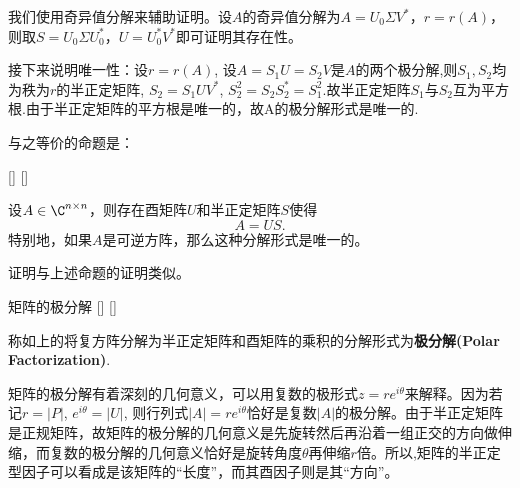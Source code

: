 \documentclass[UTF8]{ctexart}
\begin{document}
		\begin{prf}
			我们使用奇异值分解来辅助证明。设$A$的奇异值分解为$A=U_0\Sigma V^{*}$，$r=r(A)$，则取$S=U_0\Sigma U_{0}^{*}$，$U=U_0^*V^*$即可证明其存在性。

			接下来说明唯一性：设$r =r(A)$, 设$A= S_1U =S_2V$是$A$的两个极分解,则$S_1,S_2$均为秩为$r$的半正定矩阵, $S_2= S_1UV^*$, $S_2^2=S_2S_2^*=S_1^2$.故半正定矩阵$S_1$与$S_2$互为平方根.由于半正定矩阵的平方根是唯一的，故A的极分解形式是唯一的.
		\end{prf}

		与之等价的命题是：

		\begin{thm}
			[]
			{}
			[]
			[]
			
			设$A\in\C^{n\times n}$，则存在酉矩阵$U$和半正定矩阵$S$使得\[A=US.\]
			特别地，如果$A$是可逆方阵，那么这种分解形式是唯一的。
		\end{thm}

		证明与上述命题的证明类似。

		\begin{dfn}
			[]
			{矩阵的极分解}
			[]
			[]

			称如上的将复方阵分解为半正定矩阵和酉矩阵的乘积的分解形式为\textbf{极分解(Polar Factorization)}.
		\end{dfn}

		矩阵的极分解有着深刻的几何意义，可以用复数的极形式$z=re^{i\theta}$来解释。因为若记$r=|P|$, $e^{i\theta}=|U|$, 则行列式$|A| =re^{i\theta}$恰好是复数$|A|$的极分解。由于半正定矩阵是正规矩阵，故矩阵的极分解的几何意义是先旋转然后再沿着一组正交的方向做伸缩，而复数的极分解的几何意义恰好是旋转角度$\theta$再伸缩$r$倍。所以,矩阵的半正定型因子可以看成是该矩阵的“长度”，而其酉因子则是其“方向”。
\end{document}
